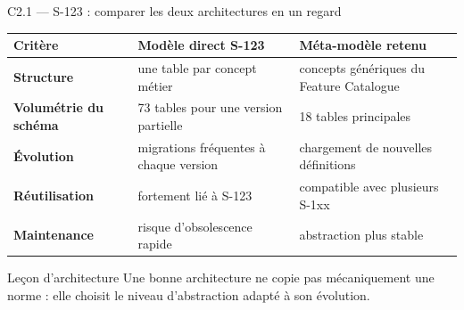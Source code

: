 
\begin{frame}{C2.1 — S-123 : comparer les deux architectures en un regard}
\scriptsize
\begin{tabularx}{\linewidth}{>{\bfseries}p{3.0cm}X X}
\toprule
Critère & Modèle direct S-123 & Méta-modèle retenu \\
\midrule
Structure & une table par concept métier & concepts génériques du Feature Catalogue \\
Volumétrie du schéma & 73 tables pour une version partielle & 18 tables principales \\
Évolution & migrations fréquentes à chaque version & chargement de nouvelles définitions \\
Réutilisation & fortement lié à S-123 & compatible avec plusieurs S-1xx \\
Maintenance & risque d'obsolescence rapide & abstraction plus stable \\
\bottomrule
\end{tabularx}
\begin{block}{Leçon d'architecture}
Une bonne architecture ne copie pas mécaniquement une norme : elle choisit le niveau d'abstraction adapté à son évolution.
\end{block}
\end{frame}


